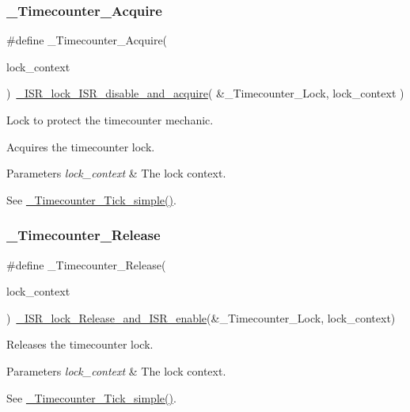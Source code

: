 \subsubsection{\texorpdfstring{\_Timecounter\_Acquire}{\_Timecounter\_Acquire}}
{\footnotesize\ttfamily \#define \+\_\+\+Timecounter\+\_\+\+Acquire(\begin{DoxyParamCaption}\item[{}]{lock\+\_\+context }\end{DoxyParamCaption})~\mbox{\hyperlink{group__RTEMSScoreISRLocks_gaa4ecfcd40e90531bdd3c348a99b3b7d9}{\+\_\+\+I\+S\+R\+\_\+lock\+\_\+\+I\+S\+R\+\_\+disable\+\_\+and\+\_\+acquire}}( \&\+\_\+\+Timecounter\+\_\+\+Lock, lock\+\_\+context )}



Lock to protect the timecounter mechanic. 

Acquires the timecounter lock.


\begin{DoxyParams}{Parameters}
{\em lock\+\_\+context} & The lock context.\\
\hline
\end{DoxyParams}
See \mbox{\hyperlink{group__RTEMSScoreTimecounter_ga4846ddfe4d962ac1cc41c022f7ae0d60}{\+\_\+\+Timecounter\+\_\+\+Tick\+\_\+simple()}}. \mbox{\label{group__RTEMSScoreTimecounter_gab0cc9fff94ea04384484711aa6330ebd}} 
\subsubsection{\texorpdfstring{\_Timecounter\_Release}{\_Timecounter\_Release}}
{\footnotesize\ttfamily \#define \+\_\+\+Timecounter\+\_\+\+Release(\begin{DoxyParamCaption}\item[{}]{lock\+\_\+context }\end{DoxyParamCaption})~\mbox{\hyperlink{group__RTEMSScoreISRLocks_ga87a2125e8bfba5f2f5b72adbeee4dcc3}{\+\_\+\+I\+S\+R\+\_\+lock\+\_\+\+Release\+\_\+and\+\_\+\+I\+S\+R\+\_\+enable}}(\&\+\_\+\+Timecounter\+\_\+\+Lock, lock\+\_\+context)}



Releases the timecounter lock. 


\begin{DoxyParams}{Parameters}
{\em lock\+\_\+context} & The lock context.\\
\hline
\end{DoxyParams}
See \mbox{\hyperlink{group__RTEMSScoreTimecounter_ga4846ddfe4d962ac1cc41c022f7ae0d60}{\+\_\+\+Timecounter\+\_\+\+Tick\+\_\+simple()}}. 


